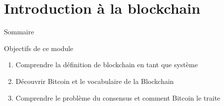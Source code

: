 \section{Introduction à la blockchain}

\begin{frame}{Sommaire}
  \setcounter{tocdepth}{2}
\end{frame}

\begin{frame}{Objectifs de ce module}
  \begin{enumerate}
    \item Comprendre la définition de blockchain en tant que système
    \item Découvrir Bitcoin et le vocabulaire de la Blockchain
    \item Comprendre le problème du consensus et comment Bitcoin le traite
  \end{enumerate}
\end{frame}


